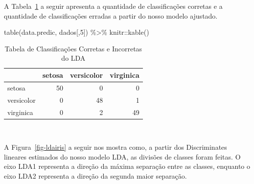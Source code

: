 \documentclass[
  a4paperpaper,
]{article}
\newenvironment{Shaded}{\begin{snugshade}}{\end{snugshade}}
\newcommand{\AttributeTok}[1]{\textcolor[rgb]{0.40,0.45,0.13}{#1}}
\newcommand{\DecValTok}[1]{\textcolor[rgb]{0.68,0.00,0.00}{#1}}
\newcommand{\FunctionTok}[1]{\textcolor[rgb]{0.28,0.35,0.67}{#1}}
\newcommand{\NormalTok}[1]{\textcolor[rgb]{0.00,0.23,0.31}{#1}}
\newcommand{\OtherTok}[1]{\textcolor[rgb]{0.00,0.23,0.31}{#1}}
\newcommand{\SpecialCharTok}[1]{\textcolor[rgb]{0.37,0.37,0.37}{#1}}
\begin{document}
\begin{Shaded}
\end{Shaded}

A Tabela~\ref{tbl-lda} a seguir apresenta a quantidade de classificações
corretas e a quantidade de classificações erradas a partir do nosso
modelo ajustado.

\begin{Shaded}
\begin{Highlighting}[]
\FunctionTok{table}\NormalTok{(data.predic, dados[,}\DecValTok{5}\NormalTok{]) }\SpecialCharTok{\%\textgreater{}\%}
\NormalTok{  knitr}\SpecialCharTok{::}\FunctionTok{kable}\NormalTok{()}
\end{Highlighting}
\end{Shaded}

\begin{longtable}[]{@{}lrrr@{}}

\caption{\label{tbl-lda}Tabela de Classificações Corretas e Incorretas
do LDA}

\tabularnewline

\toprule\noalign{}
& setosa & versicolor & virginica \\
\midrule\noalign{}
\endhead
\bottomrule\noalign{}
\endlastfoot
setosa & 50 & 0 & 0 \\
versicolor & 0 & 48 & 1 \\
virginica & 0 & 2 & 49 \\

\end{longtable}

~

A Figura~\ref{fig-ldairis} a seguir nos mostra como, a partir dos
Discriminates lineares estimados do nosso modelo LDA, as divisões de
classes foram feitas. O eixo LDA1 representa a direção da máxima
separação entre as classes, enquanto o eixo LDA2 representa a direção da
segunda maior separação.
\end{document}
